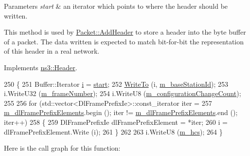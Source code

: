 \begin{DoxyParams}{Parameters}
{\em start} & an iterator which points to where the header should be written.\\
\hline
\end{DoxyParams}
This method is used by \hyperlink{classns3_1_1Packet_a465108c595a0bc592095cbcab1832ed8}{Packet\+::\+Add\+Header} to store a header into the byte buffer of a packet. The data written is expected to match bit-\/for-\/bit the representation of this header in a real network. 

Implements \hyperlink{classns3_1_1Header_afb61f1aac69ff8349a6bfe521fab5404}{ns3\+::\+Header}.


\begin{DoxyCode}
250 \{
251   Buffer::Iterator \hyperlink{bernuolliDistribution_8m_a6f6ccfcf58b31cb6412107d9d5281426}{i} = \hyperlink{namespacevisualizer_1_1core_a2a35e5d8a34af358b508dac8635754e0}{start};
252   \hyperlink{namespacens3_abe3cb0173e87a3f7e2e414358c0a08bf}{WriteTo} (i, \hyperlink{classns3_1_1OfdmDownlinkFramePrefix_a7b67a172f45eb5c21475fae2b1ccadc0}{m\_baseStationId});
253   i.WriteU32 (\hyperlink{classns3_1_1OfdmDownlinkFramePrefix_a000a256bcb20f919dae6c434205f7c6d}{m\_frameNumber});
254   i.WriteU8 (\hyperlink{classns3_1_1OfdmDownlinkFramePrefix_a46c640590dd0d172932b724d951408e4}{m\_configurationChangeCount});
255 
256   \textcolor{keywordflow}{for} (std::vector<DlFramePrefixIe>::const\_iterator iter =
257          \hyperlink{classns3_1_1OfdmDownlinkFramePrefix_a5556a09adf1ba07c0ff0d024c163ea8e}{m\_dlFramePrefixElements}.begin (); iter != 
      \hyperlink{classns3_1_1OfdmDownlinkFramePrefix_a5556a09adf1ba07c0ff0d024c163ea8e}{m\_dlFramePrefixElements}.end (); iter++)
258     \{
259       DlFramePrefixIe dlFramePrefixElement = *iter;
260       i = dlFramePrefixElement.Write (i);
261     \}
262 
263   i.WriteU8 (\hyperlink{classns3_1_1OfdmDownlinkFramePrefix_a886434776ca438227fbb61411b289f2a}{m\_hcs});
264 \}
\end{DoxyCode}


Here is the call graph for this function\+:


